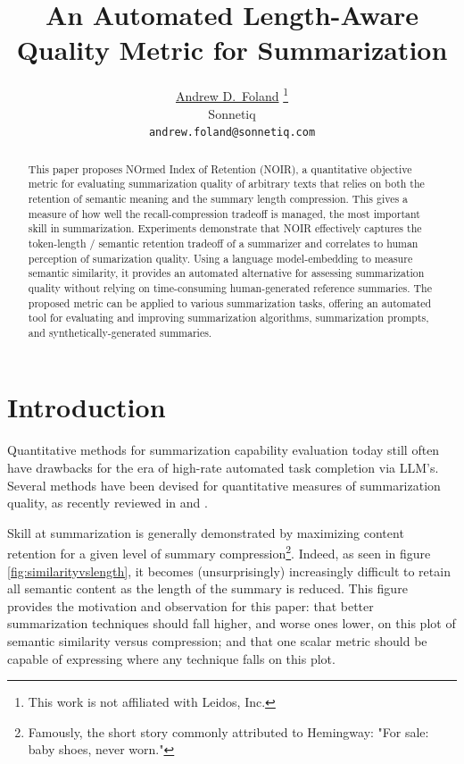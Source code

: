 \documentclass{article}
\title{An Automated Length-Aware Quality Metric for Summarization}
\author{ 
	\href{}{
		\hspace{1mm}
		Andrew D.~Foland}
	\thanks{This work is not affiliated with Leidos, Inc.
	}\\ 
    Sonnetiq\\
	\texttt{andrew.foland@sonnetiq.com} \\
}
\date{}
\begin{document}
\maketitle

\begin{abstract}
This paper proposes NOrmed Index of Retention (NOIR), a quantitative objective metric for evaluating summarization quality of arbitrary texts that relies on both the retention of semantic meaning and the summary length compression. 
This gives a measure of how well the recall-compression tradeoff is managed,
the most important skill in summarization.
Experiments demonstrate that NOIR effectively captures the token-length / semantic retention tradeoff of a summarizer and correlates to human perception of sumarization quality. 
Using a language model-embedding to measure semantic similarity, it provides an automated alternative for assessing summarization quality without relying on time-consuming human-generated reference summaries. 
The proposed metric can be applied to various summarization tasks, offering an automated tool for evaluating and improving summarization algorithms, summarization prompts, and synthetically-generated summaries.
\end{abstract}




\section{Introduction}
Quantitative methods for summarization capability evaluation today still often have drawbacks for the era of high-rate automated task completion via LLM's.
Several methods have been devised for quantitative measures of summarization quality, as recently reviewed in \citep{2023arXiv230504853R} and \citep{fabbri_summeval_2021}. 

Skill at summarization is generally demonstrated by maximizing content retention for a given level of summary compression\footnote{Famously, the short story commonly attributed to Hemingway: "For sale: baby shoes, never worn."}.  
Indeed, as seen in figure \ref{fig:similarityvslength}, it becomes (unsurprisingly) increasingly difficult to retain all semantic content as the length of the summary is reduced.
This figure provides the motivation and observation for this paper: that better summarization techniques should fall higher, and worse ones lower, on this plot of semantic similarity versus compression; and that one scalar metric should be capable of expressing where any technique falls on this plot.
\end{document}
